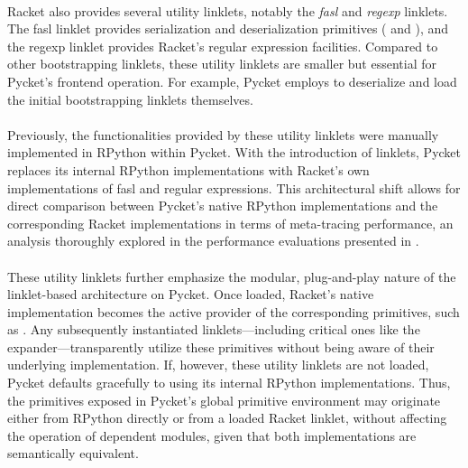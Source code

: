 			\paragraph{}%
				Racket also provides several utility linklets, notably the \emph{fasl} and \emph{regexp} linklets. The fasl linklet provides serialization and deserialization primitives ( and ), and the regexp linklet provides Racket's regular expression facilities. Compared to other bootstrapping linklets, these utility linklets are smaller but essential for Pycket’s frontend operation. For example, Pycket employs  to deserialize and load the initial bootstrapping linklets themselves.

			\paragraph{}%
				Previously, the functionalities provided by these utility linklets were manually implemented in RPython within Pycket. With the introduction of linklets, Pycket replaces its internal RPython implementations with Racket’s own implementations of fasl and regular expressions. This architectural shift allows for direct comparison between Pycket’s native RPython implementations and the corresponding Racket implementations in terms of meta-tracing performance, an analysis thoroughly explored in the performance evaluations presented in .

			\paragraph{}%
				These utility linklets further emphasize the modular, plug-and-play nature of the linklet-based architecture on Pycket. Once loaded, Racket’s native implementation becomes the active provider of the corresponding primitives, such as . Any subsequently instantiated linklets—including critical ones like the expander—transparently utilize these primitives without being aware of their underlying implementation. If, however, these utility linklets are not loaded, Pycket defaults gracefully to using its internal RPython implementations. Thus, the primitives exposed in Pycket's global primitive environment may originate either from RPython directly or from a loaded Racket linklet, without affecting the operation of dependent modules, given that both implementations are semantically equivalent.


